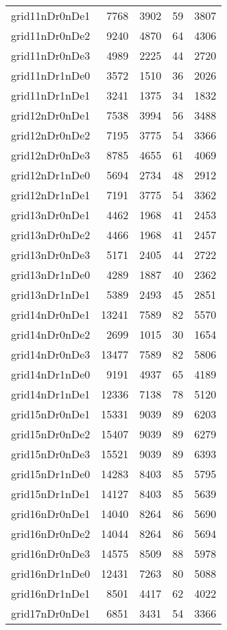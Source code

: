 \begin{longtable}{lrrrr}
grid11nDr0nDe1 & 7768 & 3902 & 59 & 3807 \\
grid11nDr0nDe2 & 9240 & 4870 & 64 & 4306 \\
grid11nDr0nDe3 & 4989 & 2225 & 44 & 2720 \\
grid11nDr1nDe0 & 3572 & 1510 & 36 & 2026 \\
grid11nDr1nDe1 & 3241 & 1375 & 34 & 1832 \\
grid12nDr0nDe1 & 7538 & 3994 & 56 & 3488 \\
grid12nDr0nDe2 & 7195 & 3775 & 54 & 3366 \\
grid12nDr0nDe3 & 8785 & 4655 & 61 & 4069 \\
grid12nDr1nDe0 & 5694 & 2734 & 48 & 2912 \\
grid12nDr1nDe1 & 7191 & 3775 & 54 & 3362 \\
grid13nDr0nDe1 & 4462 & 1968 & 41 & 2453 \\
grid13nDr0nDe2 & 4466 & 1968 & 41 & 2457 \\
grid13nDr0nDe3 & 5171 & 2405 & 44 & 2722 \\
grid13nDr1nDe0 & 4289 & 1887 & 40 & 2362 \\
grid13nDr1nDe1 & 5389 & 2493 & 45 & 2851 \\
grid14nDr0nDe1 & 13241 & 7589 & 82 & 5570 \\
grid14nDr0nDe2 & 2699 & 1015 & 30 & 1654 \\
grid14nDr0nDe3 & 13477 & 7589 & 82 & 5806 \\
grid14nDr1nDe0 & 9191 & 4937 & 65 & 4189 \\
grid14nDr1nDe1 & 12336 & 7138 & 78 & 5120 \\
grid15nDr0nDe1 & 15331 & 9039 & 89 & 6203 \\
grid15nDr0nDe2 & 15407 & 9039 & 89 & 6279 \\
grid15nDr0nDe3 & 15521 & 9039 & 89 & 6393 \\
grid15nDr1nDe0 & 14283 & 8403 & 85 & 5795 \\
grid15nDr1nDe1 & 14127 & 8403 & 85 & 5639 \\
grid16nDr0nDe1 & 14040 & 8264 & 86 & 5690 \\
grid16nDr0nDe2 & 14044 & 8264 & 86 & 5694 \\
grid16nDr0nDe3 & 14575 & 8509 & 88 & 5978 \\
grid16nDr1nDe0 & 12431 & 7263 & 80 & 5088 \\
grid16nDr1nDe1 & 8501 & 4417 & 62 & 4022 \\
grid17nDr0nDe1 & 6851 & 3431 & 54 & 3366 \\

\end{longtable}
